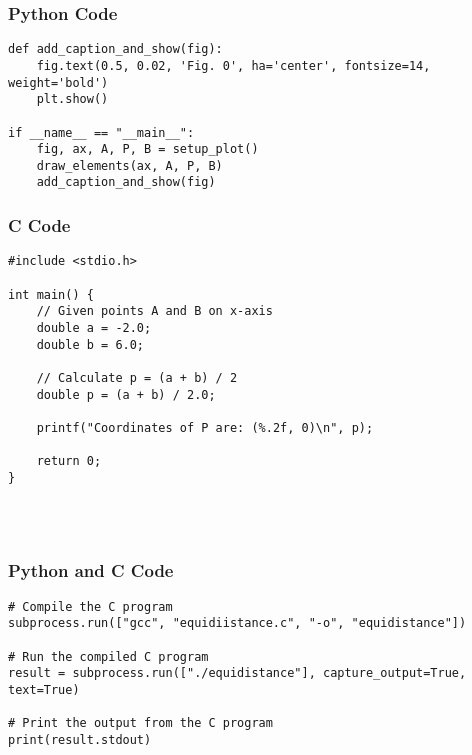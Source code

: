 \documentclass{beamer}
\begin{document}
\begin{frame}[fragile]
    \frametitle{Python Code}
      \begin{lstlisting}
def add_caption_and_show(fig):
    fig.text(0.5, 0.02, 'Fig. 0', ha='center', fontsize=14, weight='bold')
    plt.show()

if __name__ == "__main__":
    fig, ax, A, P, B = setup_plot()
    draw_elements(ax, A, P, B)
    add_caption_and_show(fig)
\end{lstlisting}
\end{frame}

\begin{frame}[fragile]
\frametitle{C Code}
\begin{lstlisting}
#include <stdio.h>

int main() {
    // Given points A and B on x-axis
    double a = -2.0;
    double b = 6.0;

    // Calculate p = (a + b) / 2
    double p = (a + b) / 2.0;

    printf("Coordinates of P are: (%.2f, 0)\n", p);

    return 0;
}




\end{lstlisting}

\end{frame}




\begin{frame}[fragile]
\frametitle{Python and C Code}

\begin{lstlisting}
# Compile the C program
subprocess.run(["gcc", "equidiistance.c", "-o", "equidistance"])

# Run the compiled C program
result = subprocess.run(["./equidistance"], capture_output=True, text=True)

# Print the output from the C program 
print(result.stdout)
\end{lstlisting}

\end{frame}
\end{document}

